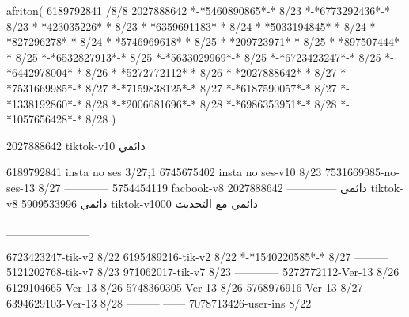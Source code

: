 afriton(
6189792841 /8/8
2027888642
*-*5460890865*-* 8/23
*-*6773292436*-* 8/23
*-*423035226*-* 8/23
*-*6359691183*-* 8/24
*-*5033194845*-* 8/24
*-*827296278*-* 8/24
*-*5746969618*-* 8/25
*-*209723971*-* 8/25
*-*897507444*-* 8/25
*-*6532827913*-* 8/25
*-*5633029969*-* 8/25
*-*6723423247*-* 8/25
*-*6442978004*-* 8/26
*-*5272772112*-* 8/26
*-*2027888642*-* 8/27
*-*7531669985*-* 8/27
*-*7159838125*-* 8/27
*-*6187590057*-* 8/27
*-*1338192860*-* 8/28
*-*2006681696*-* 8/28
*-*6986353951*-* 8/28
*-*1057656428*-* 8/28
)

2027888642 tiktok-v10
دائمي

6189792841 insta no ses
3/27;1
6745675402 insta no ses-v10
8/23
7531669985-no-ses-13
8/27
------------
5754454119 facbook-v8
دائمي
--------------
2027888642 tiktok-v8
دائمي
5909533996 tiktok-v1000
دائمي مع التحديث

__________

6723423247-tik-v2
8/22
6195489216-tik-v2
8/22
*-*1540220585*-* 8/27
---------
5121202768-tik-v7
8/23
971062017-tik-v7
8/23
------------
5272772112-Ver-13
8/26
6129104665-Ver-13
8/26
5748360305-Ver-13
8/26
5768976916-Ver-13
8/27
6394629103-Ver-13
8/28
---------
------
7078713426-user-ins
8/22
